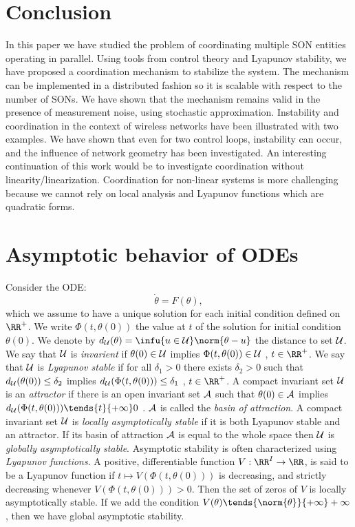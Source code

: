 \documentclass[10pt,conference,letterpaper]{IEEEtran}
\begin{document}
\section{Conclusion}\label{sec:conclusion}
	In this paper we have studied the problem of coordinating multiple \ac{SON} entities operating in parallel.  Using tools from control theory and Lyapunov stability, we have proposed a coordination mechanism to stabilize the system. The mechanism can be implemented in a distributed fashion so it is scalable with respect to the number of \acp{SON}. We have shown that the mechanism remains valid in the presence of measurement noise, using stochastic approximation. Instability and coordination in the context of wireless networks have been illustrated with two examples. We have shown that even for two control loops, instability can occur, and the influence of network geometry has been investigated. An interesting continuation of this work would be to investigate coordination without linearity/linearization. Coordination for non-linear systems is more challenging because we cannot rely on local analysis and Lyapunov functions which are quadratic forms.


\appendices
\section{Asymptotic behavior of ODEs}\label{app:odes}
	Consider the \ac{ODE}:
\begin{equation}
	\dot{\theta} = F(\theta),
\end{equation}
	which we assume to have a unique solution for each initial condition defined on $\RR^+$. We write $\Phi(t,\theta(0))$ the value at $t$ of the solution for initial condition $\theta(0)$. We denote by $d_{{\cal U}}(\theta) = \infu{u \in {\cal U}} \norm{ \theta - u}$ the distance to set ${\cal U}$. We say that ${\cal U}$ is \emph{invarient} if $\theta(0) \in {\cal U}$ implies $\Phi(t,\theta(0)) \in {\cal U} $ , $t \in \RR^+$. We say that ${\cal U}$ is \emph{Lyapunov stable} if for all $\delta_1 > 0$ there exists $\delta_2 > 0$ such that $d_{{\cal U}}(\theta(0)) \leq \delta_2$ implies $d_{{\cal U}}(\Phi(t,\theta(0))) \leq \delta_1$ , $t \in \RR^+$. A compact invariant set ${\cal U}$ is an \emph{attractor} if there is an open invariant set ${\cal A}$ such that $\theta(0) \in {\cal A}$ implies $d_{{\cal U}}(\Phi(t,\theta(0))) \tends{t}{+\infty} 0 $ . ${\cal A}$ is called the \emph{basin of attraction}.  A compact invariant set ${\cal U}$ is \emph{locally asymptotically stable} if it is both Lyapunov stable and an attractor. If its basin of attraction ${\cal A}$ is equal to the whole space then ${\cal U}$ is \emph{globally asymptotically stable}. Asymptotic stability is often characterized using \emph{Lyapunov functions}. A positive, differentiable function $V:\RR^I \to \RR$, is said to be a Lyapunov function if  $t \mapsto V(\Phi(t,\theta(0)))$ is decreasing, and strictly decreasing whenever $V(\Phi(t,\theta(0))) > 0$. Then the set of zeros of $V$ is locally asymptotically stable. If we add the condition $V(\theta) \tends{\norm{\theta}}{+\infty} +\infty$, then we have global asymptotic stability.
\end{document}
